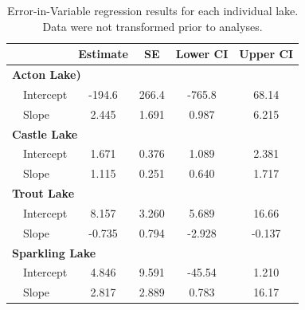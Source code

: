 \documentclass[12pt, oneside]{article}
\begin{document}
\newpage
\begin{table}[h]
\centering
\begin{threeparttable}
\caption{Error-in-Variable regression results for each individual lake. Data were not transformed prior to analyses.}
\label{tab:table3}
\begin{tabular}{@{}llcccc@{}}
\toprule
            &    & Estimate  & SE    & Lower CI  & Upper CI  \\ \midrule
\multicolumn{6}{l}{\bf{Acton Lake)}} \\
& Intercept       & -194.6     & 266.4 & -765.8    & 68.14  \\
& Slope           & 2.445     & 1.691 & 0.987     & 6.215 \\
\multicolumn{6}{l}{\bf{Castle Lake}} \\
& Intercept       & 1.671     & 0.376 & 1.089    & 2.381  \\
& Slope           & 1.115     & 0.251 & 0.640     & 1.717 \\
\multicolumn{6}{l}{\bf{Trout Lake}} \\
& Intercept       & 8.157     & 3.260 & 5.689    & 16.66  \\
& Slope           & -0.735     & 0.794 & -2.928     & -0.137 \\
\multicolumn{6}{l}{\bf{Sparkling Lake}} \\
& Intercept       & 4.846     & 9.591 & -45.54    & 1.210  \\
& Slope           & 2.817     & 2.889 & 0.783     & 16.17 \\
 \bottomrule
\end{tabular}
\end{threeparttable}
\end{table} %
\end{document}
